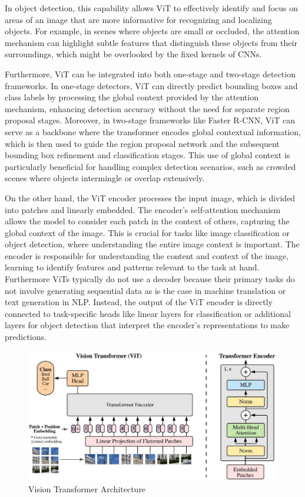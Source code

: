In object detection, this capability allows ViT to effectively identify and focus on areas of an image that are more informative for recognizing and localizing objects. 
For example, in scenes where objects are small or occluded, the attention mechanism can highlight subtle features that distinguish these objects from their surroundings, 
which might be overlooked by the fixed kernels of CNNs. 

\newpage
Furthermore, ViT can be integrated into both one-stage and two-stage detection frameworks. In one-stage detectors, ViT can directly predict bounding boxes and class 
labels by processing the global context provided by the attention mechanism, enhancing detection accuracy without the need for separate region proposal stages. 
Moreover, in two-stage frameworks like Faster R-CNN, ViT can serve as a backbone where the transformer encodes global contextual information, which is then used to 
guide the region proposal network and the subsequent bounding box refinement and classification stages. This use of global context is particularly beneficial for 
handling complex detection scenarios, such as crowded scenes where objects intermingle or overlap extensively.

On the other hand, the ViT encoder processes the input image, which is divided into patches and linearly embedded. The encoder's self-attention mechanism 
allows the model to consider each patch in the context of others, capturing the global context of the image. This is crucial for tasks like image 
classification or object detection, where understanding the entire image context is important. The encoder is responsible for understanding the content and 
context of the image, learning to identify features and patterns relevant to the task at hand. Furthermore ViTs typically do not use a decoder because their 
primary tasks do not involve generating sequential data as is the case in machine translation or text generation in NLP. Instead, the output of the ViT 
encoder is directly connected to task-specific heads like linear layers for classification or additional layers for object detection that interpret the 
encoder's representations to make predictions.


\begin{figure}[h!]
    \centering
    \includegraphics[scale=0.4]{Figures/vision-transformer.jpg}
    \caption{Vision Transformer Architecture \cite{visiontr}}
    \label{fig:tr-vit}
\end{figure}

